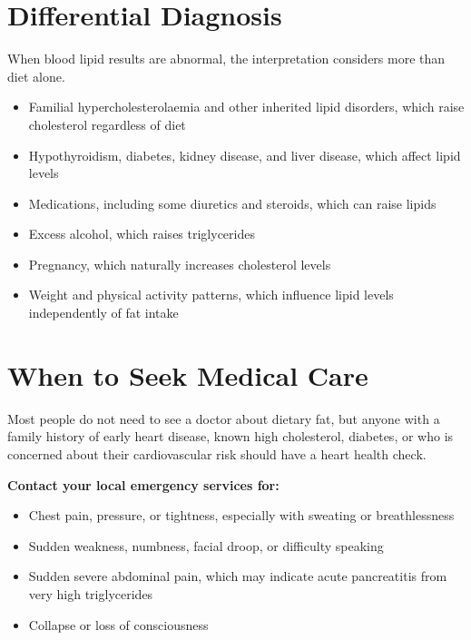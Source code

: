 \section*{Differential Diagnosis}
When blood lipid results are abnormal, the interpretation considers more than diet alone.
\begin{itemize}
    \item Familial hypercholesterolaemia and other inherited lipid disorders, which raise cholesterol regardless of diet
    \item Hypothyroidism, diabetes, kidney disease, and liver disease, which affect lipid levels
    \item Medications, including some diuretics and steroids, which can raise lipids
    \item Excess alcohol, which raises triglycerides
    \item Pregnancy, which naturally increases cholesterol levels
    \item Weight and physical activity patterns, which influence lipid levels independently of fat intake
\end{itemize}

\section*{When to Seek Medical Care}
Most people do not need to see a doctor about dietary fat, but anyone with a family history of early heart disease, known high cholesterol, diabetes, or who is concerned about their cardiovascular risk should have a heart health check.

\textbf{Contact your local emergency services for:}
\begin{itemize}
    \item Chest pain, pressure, or tightness, especially with sweating or breathlessness
    \item Sudden weakness, numbness, facial droop, or difficulty speaking
    \item Sudden severe abdominal pain, which may indicate acute pancreatitis from very high triglycerides
    \item Collapse or loss of consciousness
\end{itemize}

